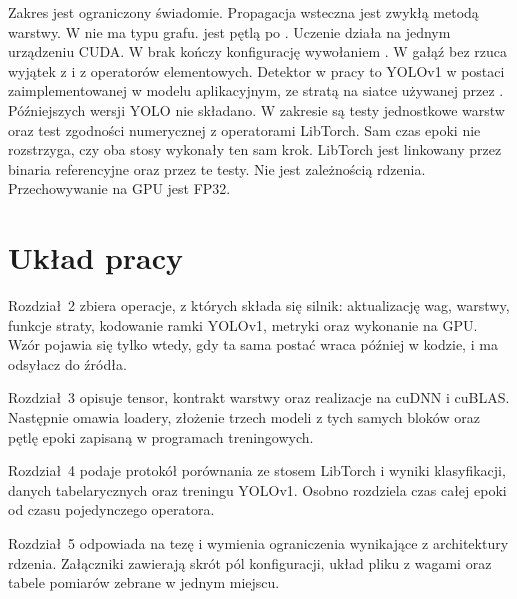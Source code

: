 Zakres jest ograniczony świadomie. Propagacja wsteczna jest zwykłą metodą warstwy. W  nie ma typu grafu.  jest pętlą po . Uczenie działa na jednym urządzeniu CUDA. W  brak  kończy konfigurację wywołaniem . W  gałąź bez  rzuca wyjątek z  i z operatorów elementowych. Detektor w pracy to YOLOv1 w postaci zaimplementowanej w modelu aplikacyjnym, ze stratą na siatce używanej przez . Późniejszych wersji YOLO nie składano. W zakresie są testy jednostkowe warstw oraz test zgodności numerycznej z operatorami LibTorch. Sam czas epoki nie rozstrzyga, czy oba stosy wykonały ten sam krok. LibTorch jest linkowany przez binaria referencyjne oraz przez te testy. Nie jest zależnością rdzenia. Przechowywanie na GPU jest FP32.

\section{Układ pracy}

Rozdział~2 zbiera operacje, z których składa się silnik: aktualizację wag, warstwy, funkcje straty, kodowanie ramki YOLOv1, metryki oraz wykonanie na GPU. Wzór pojawia się tylko wtedy, gdy ta sama postać wraca później w kodzie, i ma odsyłacz do źródła.

Rozdział~3 opisuje tensor, kontrakt warstwy oraz realizacje na cuDNN i cuBLAS. Następnie omawia loadery, złożenie trzech modeli z tych samych bloków oraz pętlę epoki zapisaną w programach treningowych.

Rozdział~4 podaje protokół porównania ze stosem LibTorch i wyniki klasyfikacji, danych tabelarycznych oraz treningu YOLOv1. Osobno rozdziela czas całej epoki od czasu pojedynczego operatora.

Rozdział~5 odpowiada na tezę i wymienia ograniczenia wynikające z architektury rdzenia. Załączniki zawierają skrót pól konfiguracji, układ pliku z wagami oraz tabele pomiarów zebrane w jednym miejscu.
